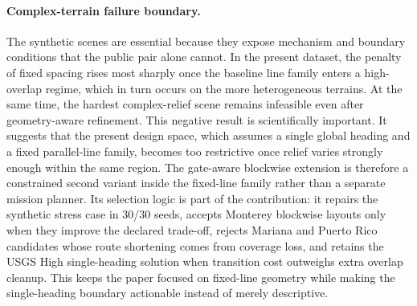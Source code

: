 \documentclass[jmse,article,submit,moreauthors]{Definitions/mdpi}
\begin{document}
\paragraph{Complex-terrain failure boundary.}
The synthetic scenes are essential because they expose mechanism and boundary conditions that the public pair alone cannot. In the present dataset, the penalty of fixed spacing rises most sharply once the baseline line family enters a high-overlap regime, which in turn occurs on the more heterogeneous terrains. At the same time, the hardest complex-relief scene remains infeasible even after geometry-aware refinement. This negative result is scientifically important. It suggests that the present design space, which assumes a single global heading and a fixed parallel-line family, becomes too restrictive once relief varies strongly enough within the same region. The gate-aware blockwise extension is therefore a constrained second variant inside the fixed-line family rather than a separate mission planner. Its selection logic is part of the contribution: it repairs the synthetic stress case in 30/30 seeds, accepts Monterey blockwise layouts only when they improve the declared trade-off, rejects Mariana and Puerto Rico candidates whose route shortening comes from coverage loss, and retains the USGS High single-heading solution when transition cost outweighs extra overlap cleanup. This keeps the paper focused on fixed-line geometry while making the single-heading boundary actionable instead of merely descriptive.
\end{document}
